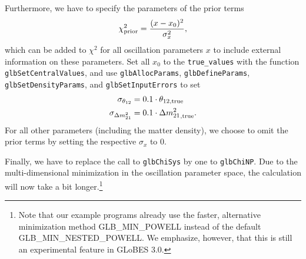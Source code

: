 \documentclass[12pt,a4paper]{article}
\newcommand{\sdm}{\ensuremath{{\Delta m_{21}^2}}}
\newcommand{\TtoK}{{\sffamily T2K}}
\theoremstyle{dotless}
\begin{document}
Furthermore, we have to specify the parameters of the prior terms
\begin{align*}
  \chi^2_{\rm prior} = \frac{(x - x_0)^2}{\sigma_x^2},
\end{align*}
which can be added to $\chi^2$ for all oscillation parameters $x$ to
include external information on these parameters. Set all $x_0$ to the
{\tt true\_values} with the function {\tt glbSetCentralValues}, and use
{\tt glbAllocParams}, {\tt glbDefineParams}, {\tt glbSetDensityParams},
and {\tt glbSetInputErrors} to set
\begin{align*}
  \sigma_{\theta_{12}} &= 0.1 \cdot \theta_{12, \rm true} \\
  \sigma_\sdm          &= 0.1 \cdot \sdm_{\rm, true}.
\end{align*}
For all other parameters (including the matter density), we choose to omit
the prior terms by setting the respective $\sigma_x$ to 0.

Finally, we have to replace the call to {\tt glbChiSys} by one to {\tt glbChiNP}.
Due to the multi-dimensional minimization in the oscillation parameter space,
the calculation will now take a bit longer.\footnote{Note that our example
programs already use the faster, alternative minimization method GLB\_MIN\_POWELL
instead of the default GLB\_MIN\_NESTED\_POWELL. We emphasize, however, that
this is still an experimental feature in GLoBES 3.0.}
\end{document}

